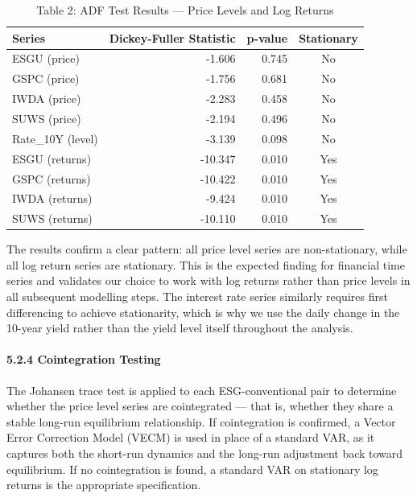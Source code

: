 \documentclass[
]{article}
\begin{document}
\begin{longtable}[t]{lrrc}
\caption{\label{tab:stationarity-summary}Table 2: ADF Test Results — Price Levels and Log Returns}\\
\toprule
\textbf{Series} & \textbf{Dickey-Fuller Statistic} & \textbf{p-value} & \textbf{Stationary}\\
\midrule
ESGU (price) & -1.606 & 0.745 & No\\
GSPC (price) & -1.756 & 0.681 & No\\
IWDA (price) & -2.283 & 0.458 & No\\
SUWS (price) & -2.194 & 0.496 & No\\
Rate\_10Y (level) & -3.139 & 0.098 & No\\
\midrule
\addlinespace
ESGU (returns) & -10.347 & 0.010 & Yes\\
GSPC (returns) & -10.422 & 0.010 & Yes\\
IWDA (returns) & -9.424 & 0.010 & Yes\\
SUWS (returns) & -10.110 & 0.010 & Yes\\
\bottomrule
\end{longtable}

The results confirm a clear pattern: all price level series are
non-stationary, while all log return series are stationary. This is the
expected finding for financial time series and validates our choice to
work with log returns rather than price levels in all subsequent
modelling steps. The interest rate series similarly requires first
differencing to achieve stationarity, which is why we use the daily
change in the 10-year yield rather than the yield level itself
throughout the analysis.

\paragraph{5.2.4 Cointegration Testing}\label{cointegration-testing}

The Johansen trace test is applied to each ESG-conventional pair to
determine whether the price level series are cointegrated --- that is,
whether they share a stable long-run equilibrium relationship. If
cointegration is confirmed, a Vector Error Correction Model (VECM) is
used in place of a standard VAR, as it captures both the short-run
dynamics and the long-run adjustment back toward equilibrium. If no
cointegration is found, a standard VAR on stationary log returns is the
appropriate specification.

\begingroup\fontsize{10}{12}\selectfont
\end{document}
